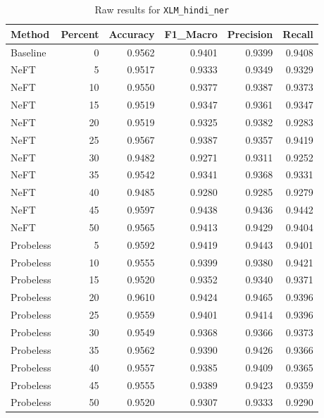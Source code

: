 \documentclass[12pt]{article}
\begin{document}
\begin{table}[H]
\centering
\caption{Raw results for \texttt{XLM\_hindi\_ner}}
\label{tab:xlm-hindi-ner}
\begin{tabular}{lrrrrr}
\toprule
Method & Percent & Accuracy & F1\_Macro & Precision & Recall \\
\midrule
Baseline & 0 & 0.9562 & 0.9401 & 0.9399 & 0.9408 \\
NeFT & 5 & 0.9517 & 0.9333 & 0.9349 & 0.9329 \\
NeFT & 10 & 0.9550 & 0.9377 & 0.9387 & 0.9373 \\
NeFT & 15 & 0.9519 & 0.9347 & 0.9361 & 0.9347 \\
NeFT & 20 & 0.9519 & 0.9325 & 0.9382 & 0.9283 \\
NeFT & 25 & 0.9567 & 0.9387 & 0.9357 & 0.9419 \\
NeFT & 30 & 0.9482 & 0.9271 & 0.9311 & 0.9252 \\
NeFT & 35 & 0.9542 & 0.9341 & 0.9368 & 0.9331 \\
NeFT & 40 & 0.9485 & 0.9280 & 0.9285 & 0.9279 \\
NeFT & 45 & 0.9597 & 0.9438 & 0.9436 & 0.9442 \\
NeFT & 50 & 0.9565 & 0.9413 & 0.9429 & 0.9404 \\
Probeless & 5 & 0.9592 & 0.9419 & 0.9443 & 0.9401 \\
Probeless & 10 & 0.9555 & 0.9399 & 0.9380 & 0.9421 \\
Probeless & 15 & 0.9520 & 0.9352 & 0.9340 & 0.9371 \\
Probeless & 20 & 0.9610 & 0.9424 & 0.9465 & 0.9396 \\
Probeless & 25 & 0.9559 & 0.9401 & 0.9414 & 0.9396 \\
Probeless & 30 & 0.9549 & 0.9368 & 0.9366 & 0.9373 \\
Probeless & 35 & 0.9562 & 0.9390 & 0.9426 & 0.9366 \\
Probeless & 40 & 0.9557 & 0.9385 & 0.9409 & 0.9365 \\
Probeless & 45 & 0.9555 & 0.9389 & 0.9423 & 0.9359 \\
Probeless & 50 & 0.9520 & 0.9307 & 0.9333 & 0.9290 \\
\bottomrule
\end{tabular}
\end{table}
\end{document}
